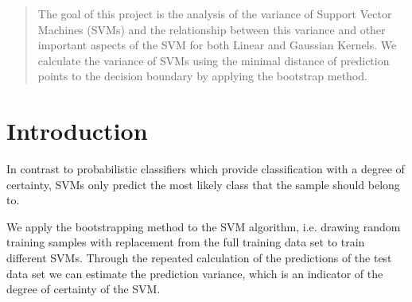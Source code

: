 \documentclass[a1,portrait]{a0poster}
\begin{document}
\vspace{1cm} %
\color{hu}
\noindent\makebox[\linewidth]{\rule{\paperwidth}{2pt}}
\color{Black}
\begin{multicols}{3} %


\color{hu} %

\begin{abstract}
\footnotesize
The goal of this project is the analysis of the variance of Support Vector Machines (SVMs) and the relationship between this variance and other important aspects of the SVM for both Linear and Gaussian Kernels. We calculate the variance of SVMs using the minimal distance of prediction points to the decision boundary by applying the bootstrap method.  
\end{abstract}

\footnotesize

\color{Black} %

\section*{Introduction}

In contrast to probabilistic classifiers which provide classification with a degree of certainty, SVMs only predict the most likely class that the sample should belong to.  

We apply the bootstrapping method to the SVM algorithm, i.e. drawing random training samples with replacement from the full training data set to train different SVMs. Through the repeated calculation of the predictions of the test data set we can estimate the prediction variance, which is an indicator of the degree of certainty of the SVM. 


\end{multicols}
\end{document}
